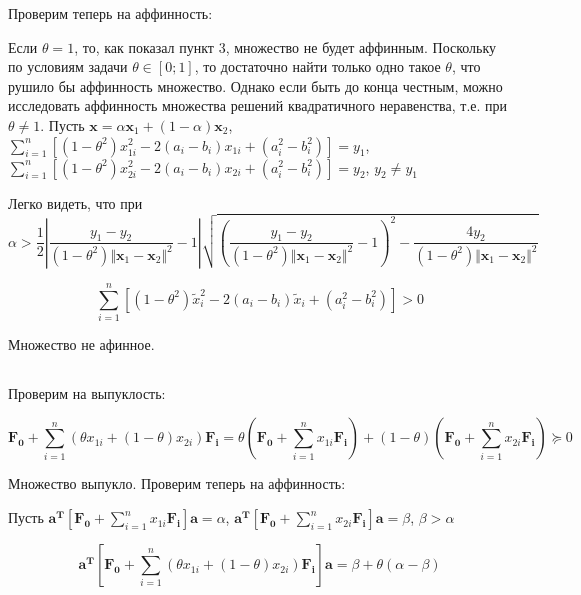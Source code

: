 	Проверим теперь на аффинность:	
	
	Если $\theta = 1$, то, как показал пункт 3, множество не будет аффинным. Поскольку по условиям задачи $\theta \in \left[ 0;1 \right] $, то достаточно найти только одно такое $\theta$, что рушило бы аффинность множество. Однако если быть до конца честным, можно исследовать аффинность множества решений квадратичного неравенства, т.е. при $\theta \neq 1$. Пусть $\mathbf{x} = \alpha\mathbf{x}_1 + (1-\alpha)\mathbf{x}_2$, $\sum\limits_{i=1}^{n}\left[(1-\theta^2)x_{1i}^2 - 2(a_i-b_i)x_{1i} + (a_i^2-b_i^2) \right]  = y_1$, $\sum\limits_{i=1}^{n}\left[(1-\theta^2)x_{2i}^2 - 2(a_i-b_i)x_{2i} + (a_i^2-b_i^2) \right]  = y_2$, $y_2 \neq y_1$
	
	Легко видеть, что при 
	\begin{equation}
	\alpha > \frac12 \left|  \frac{y_1-y_2}{(1-\theta^2)\Vert \mathbf{x}_1 - \mathbf{x}_2 \Vert^2} - 1 \right|  \sqrt{\left( \frac{y_1-y_2}{(1-\theta^2)\Vert \mathbf{x}_1 - \mathbf{x}_2 \Vert^2} - 1\right)^2 -  \frac{4 y_2}{(1-\theta^2)\Vert \mathbf{x}_1 - \mathbf{x}_2 \Vert^2} }
	\end{equation}
	
	\begin{equation}
	\sum\limits_{i=1}^{n}\left[(1-\theta^2)\tilde{x}_i^2 - 2(a_i-b_i)\tilde{x}_i + (a_i^2-b_i^2) \right] > 0
	\end{equation}
	
	Множество не афинное.
	
	\subsection{}
	
	Проверим на выпуклость:
	
	\begin{equation}
	\mathbf{F_0} + \sum\limits_{i=1}^{n}(\theta x_{1i} + (1-\theta) x_{2i} )\mathbf{F_i} = \theta(\mathbf{F_0} + \sum\limits_{i=1}^{n} x_{1i}\mathbf{F_i}) + (1-\theta)(\mathbf{F_0} + \sum\limits_{i=1}^{n} x_{2i} \mathbf{F_i}) \succeq 0
	\end{equation}
	
	Множество выпукло. Проверим теперь на аффинность:
	
	Пусть  $\mathbf{a^T} \left[ \mathbf{F_0} + \sum\limits_{i=1}^{n} x_{1i} \mathbf{F_i}\right] \mathbf{a} = \alpha$, $\mathbf{a^T} \left[ \mathbf{F_0} + \sum\limits_{i=1}^{n} x_{2i} \mathbf{F_i}\right] \mathbf{a} = \beta$, $\beta > \alpha$
	
	\begin{equation}
	\mathbf{a^T} \left[ \mathbf{F_0} + \sum\limits_{i=1}^{n}(\theta x_{1i} + (1-\theta) x_{2i} )\mathbf{F_i} \right] \mathbf{a}= \beta + \theta (\alpha - \beta)
	\end{equation}
	
